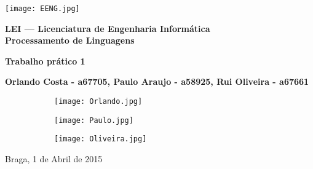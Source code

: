 \begin{titlepage}
\begin{center}

\begin{flushleft}
\texttt{[image: EENG.jpg]}\\
\end{flushleft}

\vspace{1.5cm}

\Large{\textbf{LEI --- Licenciatura de Engenharia Informática}}\\
\vspace{1cm}
\Large{\textbf{Processamento de Linguagens}}\\

\vspace{1cm}

\Huge{\textbf{Trabalho prático 1}} \\

\vspace{2cm}

\Large{\textbf{Orlando Costa -  a67705, Paulo Araujo - a58925, Rui Oliveira - a67661}}\\
\begin{figure}[h]
\centering
\begin{subfigure}{.3\textwidth}
  \centering
  \texttt{[image: Orlando.jpg]}
\end{subfigure}
\begin{subfigure}{.3\textwidth}
  \centering
  \texttt{[image: Paulo.jpg]}
\end{subfigure}
\begin{subfigure}{.3\textwidth}
  \centering
  \texttt{[image: Oliveira.jpg]}
\end{subfigure}
\end{figure}

\vspace{1.5cm}
Braga, 1 de Abril de 2015

\end{center}

\end{titlepage}
